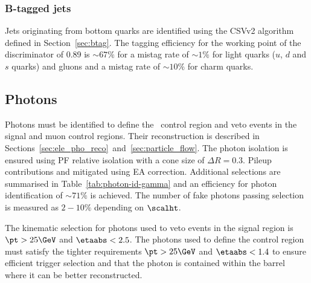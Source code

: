 \subsubsection{B-tagged jets}

Jets originating from bottom quarks are identified using the CSVv2 algorithm defined in Section~\ref{sec:btag}. 
The tagging efficiency for the working point of the discriminator of 0.89 is $\sim 67\%$ for a mistag rate
of $\sim 1\%$ for light quarks ($u$, $d$ and $s$ quarks) and gluons and a mistag rate of $\sim 10\%$ for
charm quarks.

\subsection{Photons}

Photons must be identified to define the \gj~control region and veto events in the signal and
muon control regions. Their reconstruction is described in Sections~\ref{sec:ele_pho_reco}~and~\ref{sec:particle_flow}. The photon isolation is 
ensured using PF relative isolation with a cone size of $\Delta R = 0.3$. Pileup contributions 
and mitigated using EA correction. Additional selections are summarised 
in Table~\ref{tab:photon-id-gamma} and an efficiency for photon identification of $\sim71\%$
is achieved. The number of fake photons passing selection is measured as $2-10\%$ depending on $\scalht$.

The kinematic selection for photons used to veto events in the signal region is $\pt > 25\GeV$
and $\etaabs < 2.5$. The photons used to define the control region must satisfy the tighter 
requirements $\pt > 25\GeV$ and $\etaabs < 1.4$ to ensure efficient trigger selection and
that the photon is contained within the barrel where it can be better reconstructed.

